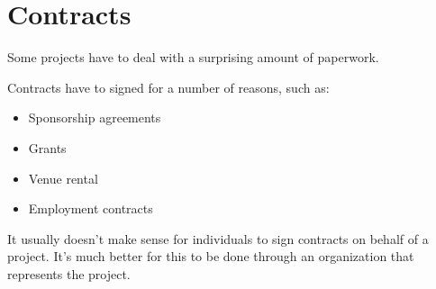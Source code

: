 


\chapter{Contracts}

Some projects have to deal with a surprising amount of paperwork.

Contracts have to signed for a number of reasons, such as:

\begin{itemize}

\item Sponsorship agreements

\item Grants

\item Venue rental

\item Employment contracts

\end{itemize}

It usually doesn't make sense for individuals to sign contracts on behalf of a project.  It's much better for this to be done through an organization that represents the project.

